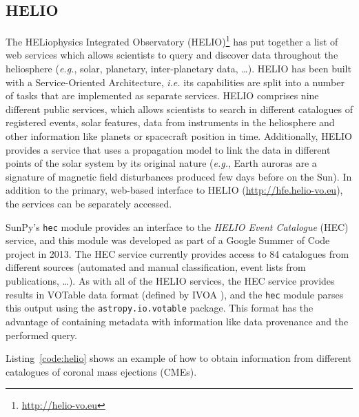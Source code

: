 \subsection{HELIO}\label{ssec:helio}

The HELiophysics Integrated Observatory 
(HELIO)\footnote{\url{http://helio-vo.eu}} has put together a list of web 
services which allows scientists to query and discover data throughout 
the heliosphere (\textit{e.g.}, solar, planetary, inter-planetary data, 
\ldots)\cite{dps2012}. 
HELIO has been built with a Service-Oriented Architecture, 
\textit{i.e.} its capabilities are split into a number of tasks that are 
implemented as separate services. 
HELIO comprises nine different public services, which allows scientists
to search in different catalogues of registered events, solar features,
data from instruments in the heliosphere and other information like planets or 
spacecraft position in time. 
Additionally, HELIO provides a service that uses a propagation model to link 
the data in different points of the solar system by its original nature 
(\textit{e.g.}, Earth auroras are a signature of magnetic field disturbances 
produced few days before on the Sun).
In addition to the primary, web-based interface to HELIO
(\url{http://hfe.helio-vo.eu}), the services can be separately accessed.

SunPy's \texttt{hec} module provides an interface to the
\textit{HELIO Event Catalogue} (HEC) service, and this module was developed as
part of a Google Summer of Code project in 2013.
The HEC service currently provides access to 84 catalogues from different
sources (automated and manual classification, event lists from publications, \ldots).
As with all of the HELIO services, the HEC service provides results in VOTable 
data format (defined by IVOA \cite{ochsenbein_ivoa_2011}), and the \texttt{hec}
module parses this output using the \texttt{astropy.io.votable} package.
This format has the advantage of containing metadata with information like
data provenance and the performed query.

Listing~\ref{code:helio} shows an example of how to obtain information
from different catalogues of coronal mass ejections (CMEs).

